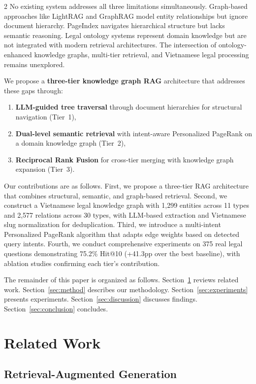 \documentclass[11pt,a4paper]{article}
\begin{document}
\begin{multicols}{2}
No existing system addresses all three limitations simultaneously. Graph-based approaches like LightRAG \cite{ref5} and GraphRAG \cite{ref4} model entity relationships but ignore document hierarchy. PageIndex \cite{ref14} navigates hierarchical structure but lacks semantic reasoning. Legal ontology systems \cite{ref6,ref8} represent domain knowledge but are not integrated with modern retrieval architectures. The intersection of ontology-enhanced knowledge graphs, multi-tier retrieval, and Vietnamese legal processing remains unexplored.

We propose a \textbf{three-tier knowledge graph RAG} architecture that addresses these gaps through:
\begin{enumerate}
\item \textbf{LLM-guided tree traversal} through document hierarchies for structural navigation (Tier~1),
\item \textbf{Dual-level semantic retrieval} with intent-aware Personalized PageRank on a domain knowledge graph (Tier~2),
\item \textbf{Reciprocal Rank Fusion} for cross-tier merging with knowledge graph expansion (Tier~3).
\end{enumerate}

Our contributions are as follows. First, we propose a three-tier RAG architecture that combines structural, semantic, and graph-based retrieval. Second, we construct a Vietnamese legal knowledge graph with 1,299 entities across 11 types and 2,577 relations across 30 types, with LLM-based extraction and Vietnamese slug normalization for deduplication. Third, we introduce a multi-intent Personalized PageRank algorithm that adapts edge weights based on detected query intents. Fourth, we conduct comprehensive experiments on 375 real legal questions demonstrating 75.2\% Hit@10 (+41.3pp over the best baseline), with ablation studies confirming each tier's contribution.

The remainder of this paper is organized as follows. Section~\ref{sec:related} reviews related work. Section~\ref{sec:method} describes our methodology. Section~\ref{sec:experiments} presents experiments. Section~\ref{sec:discussion} discusses findings. Section~\ref{sec:conclusion} concludes.

\section{Related Work}
\label{sec:related}

\subsection{Retrieval-Augmented Generation}


\end{multicols}
\end{document}
